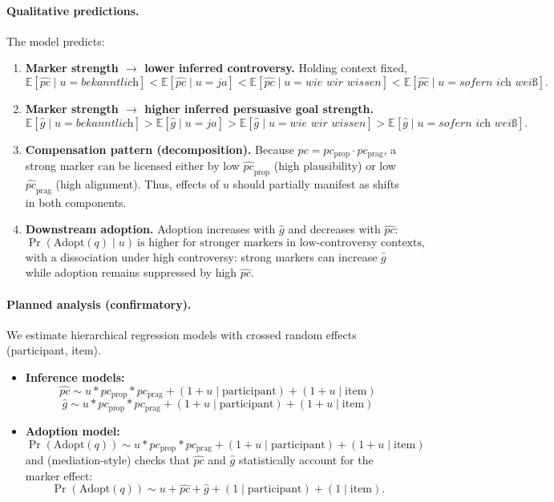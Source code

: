 \documentclass[12pt]{article}
\begin{document}
\paragraph{Qualitative predictions.}
The model predicts:

\begin{enumerate}
\item \textbf{Marker strength $\rightarrow$ lower inferred controversy.}
Holding context fixed,
\[
\mathbb{E}[\widehat{pc}\mid u=\textit{bekanntlich}]
<
\mathbb{E}[\widehat{pc}\mid u=\textit{ja}]
<
\mathbb{E}[\widehat{pc}\mid u=\textit{wie wir wissen}]
<
\mathbb{E}[\widehat{pc}\mid u=\textit{sofern ich weiß}].
\]
\item \textbf{Marker strength $\rightarrow$ higher inferred persuasive goal strength.}
\[
\mathbb{E}[\widehat{g}\mid u=\textit{bekanntlich}]
>
\mathbb{E}[\widehat{g}\mid u=\textit{ja}]
>
\mathbb{E}[\widehat{g}\mid u=\textit{wie wir wissen}]
>
\mathbb{E}[\widehat{g}\mid u=\textit{sofern ich weiß}].
\]
\item \textbf{Compensation pattern (decomposition).}
Because $pc=pc_{\text{prop}}\cdot pc_{\text{prag}}$, a strong marker can be licensed either by
low $\widehat{pc}_{\text{prop}}$ (high plausibility) or low $\widehat{pc}_{\text{prag}}$ (high alignment).
Thus, effects of $u$ should partially manifest as shifts in both components.
\item \textbf{Downstream adoption.}
Adoption increases with $\widehat{g}$ and decreases with $\widehat{pc}$:
\[
\Pr(\mathrm{Adopt}(q)\mid u)
\ \text{is higher for stronger markers in low-controversy contexts,}
\]
with a dissociation under high controversy: strong markers can increase $\widehat{g}$ while adoption remains suppressed by high $\widehat{pc}$.
\end{enumerate}

\paragraph{Planned analysis (confirmatory).}
We estimate hierarchical regression models with crossed random effects (participant, item).

\begin{itemize}
\item \textbf{Inference models:}
\[
\widehat{pc} \sim u * pc_{\text{prop}} * pc_{\text{prag}} + (1+u\mid \text{participant}) + (1+u\mid \text{item})
\]
\[
\widehat{g} \sim u * pc_{\text{prop}} * pc_{\text{prag}} + (1+u\mid \text{participant}) + (1+u\mid \text{item})
\]
\item \textbf{Adoption model:}
\[
\Pr(\mathrm{Adopt}(q)) \sim u * pc_{\text{prop}} * pc_{\text{prag}} + (1+u\mid \text{participant}) + (1+u\mid \text{item})
\]
and (mediation-style) checks that $\widehat{pc}$ and $\widehat{g}$ statistically account for the marker effect:
\[
\Pr(\mathrm{Adopt}(q)) \sim u + \widehat{pc} + \widehat{g} + (1\mid\text{participant}) + (1\mid\text{item}).
\]
\end{itemize}
\end{document}
